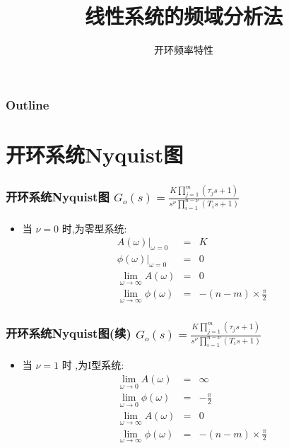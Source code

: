 \documentclass[table]{beamer}
\subtitle{开环频率特性}
\title{线性系统的频域分析法}
\author{}
\date{}
\begin{document}
\maketitle

\begin{frame}
\frametitle{Outline}
\setcounter{tocdepth}{3}
\tableofcontents
\end{frame}













\section{开环系统Nyquist图}
\label{sec-1}
\begin{frame}
\frametitle{开环系统Nyquist图 $G_o(s) =\frac{K\prod_{j=1}^m(\tau_j s+1)}{s^{\nu}\prod_{i=1}^{n-\nu}(T_i s+1)}$}
\label{sec-1-1}

\begin{itemize}
\item 当  $\nu=0$  时,为零型系统:
     \begin{eqnarray*}
     \left. A(\omega)\right|_{\omega=0} & = & K\\
     \left. \phi(\omega)\right|_{\omega=0}&=&0 \\
     \lim_{\omega\rightarrow\infty} A(\omega)&=&0 \\
     \lim_{\omega\rightarrow\infty} \phi(\omega)&=& -(n-m)\times\frac{\pi}{2} 
     \end{eqnarray*}
\end{itemize}
\end{frame}
\begin{frame}
\frametitle{开环系统Nyquist图(续) $G_o(s) =\frac{K\prod_{j=1}^m(\tau_j s+1)}{s^{\nu}\prod_{i=1}^{n-\nu}(T_i s+1)}$}
\label{sec-1-2}

\begin{itemize}
\item 当  $\nu=1$  时 ,为I型系统:
     \begin{eqnarray*}
     \lim_{\omega\rightarrow 0} A(\omega) & = & \infty\\
     \lim_{\omega\rightarrow 0} \phi(\omega)&=&-\frac{\pi}{2} \\
     \lim_{\omega\rightarrow\infty} A(\omega)&=&0 \\
     \lim_{\omega\rightarrow\infty} \phi(\omega)&=& -(n-m)\times\frac{\pi}{2} 
     \end{eqnarray*}
\end{itemize}
\end{frame}
\end{document}
